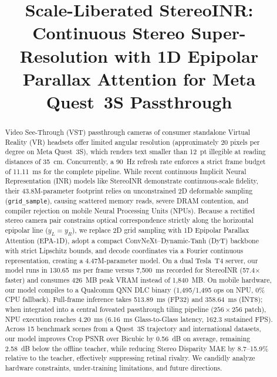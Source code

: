 \documentclass[conference]{IEEEtran}
\begin{document}
\title{Scale-Liberated StereoINR: Continuous Stereo Super-Resolution with 1D Epipolar Parallax Attention for Meta Quest~3S Passthrough}

\author{}

\maketitle

\begin{abstract}
Video See-Through (VST) passthrough cameras of consumer standalone Virtual Reality (VR) headsets offer limited angular resolution (approximately 20 pixels per degree on Meta Quest~3S), which renders text smaller than 12~pt illegible at reading distances of 35~cm. Concurrently, a 90~Hz refresh rate enforces a strict frame budget of 11.11~ms for the complete pipeline. While recent continuous Implicit Neural Representation (INR) models like StereoINR demonstrate continuous-scale fidelity, their 43.8M-parameter footprint relies on unconstrained 2D deformable sampling (\texttt{grid\_sample}), causing scattered memory reads, severe DRAM contention, and compiler rejection on mobile Neural Processing Units (NPUs). Because a rectified stereo camera pair constrains optical correspondence strictly along the horizontal epipolar line ($y_L = y_R$), we replace 2D grid sampling with 1D Epipolar Parallax Attention (EPA-1D), adopt a compact ConvNeXt--Dynamic-Tanh (DyT) backbone with strict Lipschitz bounds, and decode coordinates via a Fourier continuous representation, creating a 4.47M-parameter model. On a dual Tesla~T4 server, our model runs in 130.65~ms per frame versus 7{,}500~ms recorded for StereoINR (57.4$\times$ faster) and consumes 426~MB peak VRAM instead of 1{,}840~MB. On mobile hardware, our model compiles to a Qualcomm QNN DLC binary (1,495/1,495 ops on NPU, 0\% CPU fallback). Full-frame inference takes 513.89~ms (FP32) and 358.64~ms (INT8); when integrated into a central foveated passthrough tiling pipeline ($256 \times 256$ patch), NPU execution reaches 4.20~ms (6.16~ms Glass-to-Glass latency, 162.3 sustained FPS). Across 15 benchmark scenes from a Quest~3S trajectory and international datasets, our model improves Crop PSNR over Bicubic by 0.56~dB on average, remaining 2.58~dB below the offline teacher, while reducing Stereo Disparity MAE by 8.7--15.9\% relative to the teacher, effectively suppressing retinal rivalry. We candidly analyze hardware constraints, under-training limitations, and future directions.
\end{abstract}
\end{document}
